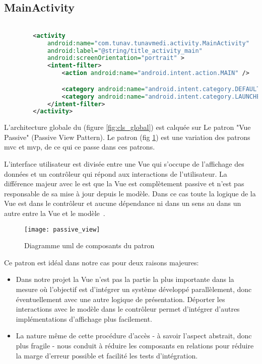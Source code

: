 \subsection{MainActivity}

\begin{lstlisting}[language=xml, caption=Déclaration dans AndroidManifest de MainActivity]

        <activity
            android:name="com.tunav.tunavmedi.activity.MainActivity"
            android:label="@string/title_activity_main"
            android:screenOrientation="portrait" >
            <intent-filter>
                <action android:name="android.intent.action.MAIN" />

                <category android:name="android.intent.category.DEFAULT" />
                <category android:name="android.intent.category.LAUNCHER" />
            </intent-filter>
        </activity>

\end{lstlisting}

L'architecture globale du   (figure \ref{fig:cls_global})
est calquée sur Le patron "Vue Passive" (Passive View Pattern). Le patron
 (fig \ref{fig:passive_view}) est une variation des
patrons \gls{mvc} et \gls{mvp}, de ce qui ce passe dans ces patrons.

L'interface utilisateur est divisée entre une Vue qui s'occupe de
l'affichage des données et un contrôleur qui répond aux interactions de
l'utilisateur. La différence majeur avec le  est que la
Vue est complètement passive et n'est pas responsable de sa mise à jour
depuis le modèle. Dans ce cas toute la logique de la Vue est dans le
contrôleur et aucune dépendance ni dans un sens au dans un autre entre
la Vue et le modèle~\cite{fowler:passive_view}.

\begin{figure}
\center
\texttt{[image: passive\_view]}
\caption{Diagramme \gls{uml} de composants du patron ~\cite{fowler:passive_view}}
\label{fig:passive_view}
\end{figure}

Ce patron est idéal dans notre cas pour deux raisons majeures:

\begin{itemize} 

\item Dans notre projet la Vue n'est pas la partie la plus importante
dans la mesure où l'objectif est d'intégrer un système développé
parallèlement, donc éventuellement avec une autre logique de
présentation. Déporter les interactions avec le modèle dans le
contrôleur permet d'intégrer d'autres implémentations d'affichage plus
facilement.

\item La nature même de cette procédure d’accès - à savoir l’aspect
abstrait, donc plus fragile - nous conduit à réduire les composants en
relations pour réduire la marge d'erreur possible et facilité les tests d’intégration.

\end{itemize}

